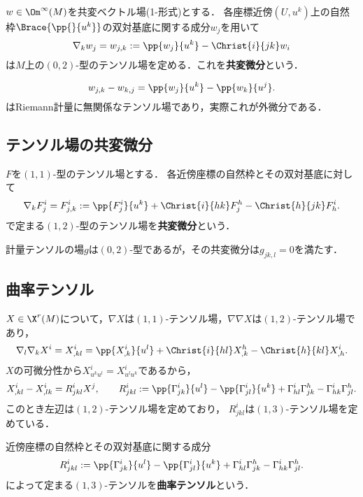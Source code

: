 \documentclass[uplatex,dvipdfmx]{jsreport}
\begin{document}
\begin{definition}
    $w\in\Om^\infty(M)$を共変ベクトル場(1-形式)とする．
    各座標近傍$(U,u^k)$上の自然枠$\Brace{\pp{}{u^k}}$の双対基底に関する成分$w_j$を用いて
    \[\nabla_kw_j=w_{j,k}:=\pp{w_j}{u^k}-\Christ{i}{jk}w_i\]
    は$M$上の$(0,2)$-型のテンソル場を定める．これを\textbf{共変微分}という．
\end{definition}
\begin{remarks}
    \[w_{j,k}-w_{k,j}=\pp{w_j}{u^k}-\pp{w_k}{u^j}.\]
    はRiemann計量に無関係なテンソル場であり，実際これが外微分である．
\end{remarks}

\subsection{テンソル場の共変微分}

\begin{definition}
    $F$を$(1,1)$-型のテンソル場とする．
    各近傍座標の自然枠とその双対基底に対して
    \[\nabla_kF^i_j=F^i_{j,k}:=\pp{F^i_j}{u^k}+\Christ{i}{hk}F^h_j-\Christ{h}{jk}F^i_h.\]
    で定まる$(1,2)$-型のテンソル場を\textbf{共変微分}という．
\end{definition}

\begin{example}[Ricciの補題]
    計量テンソルの場$g$は$(0,2)$-型であるが，その共変微分は$g_{jk,l}=0$を満たす．
\end{example}

\subsection{曲率テンソル}

\begin{observation}
    $X\in\X^r(M)$について，$\nabla X$は$(1,1)$-テンソル場，$\nabla\nabla X$は$(1,2)$-テンソル場であり，
    \[\nabla_l\nabla_kX^i=X^i_{,kl}=\pp{X^i_{,k}}{u^l}+\Christ{i}{hl}X^h_{,k}-\Christ{h}{kl}X^i_{,h}.\]
    $X$の可微分性から$X^i_{u^ku^l}=X^i_{u^lu^k}$であるから，
    \[X^i_{,kl}-X^i_{,lk}=R^i_{jkl}X^j,\qquad R^i_{jkl}:=\pp{\Gamma^i_{jk}}{u^l}-\pp{\Gamma^i_{jl}}{u^k}+\Gamma^i_{hl}\Gamma^h_{jk}-\Gamma^i_{hk}\Gamma^h_{jl}.\]
    このとき左辺は$(1,2)$-テンソル場を定めており，
    $R^i_{jkl}$は$(1,3)$-テンソル場を定めている．
\end{observation}

\begin{definition}
    近傍座標の自然枠とその双対基底に関する成分
    \[R^i_{jkl}:=\pp{\Gamma^i_{jk}}{u^l}-\pp{\Gamma^i_{jl}}{u^k}+\Gamma^i_{hl}\Gamma^h_{jk}-\Gamma^i_{hk}\Gamma^h_{jl}.\]
    によって定まる$(1,3)$-テンソルを\textbf{曲率テンソル}という．
\end{definition}
\end{document}

